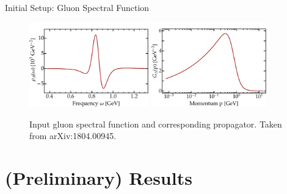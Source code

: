 \begin{frame}{Initial Setup: Gluon Spectral Function}
\begin{figure}[t]
\hfill
	\centering
	\includegraphics[width = 0.46\textwidth, trim= 4em 0 0 0]{figs/plots/GluonSpecFuncPlot}
\hfill
	\includegraphics[width = 0.445\textwidth, trim= 4em 0 0 0]{figs/plots/GluonPropPlot}
\hfill
	\caption[Input gluon spectral function and corresponding propagator.]{Input gluon spectral function and corresponding propagator. Taken from arXiv:\alert{1804.00945}.}
\label{fig:gluon_specfunc_and_prop}
\end{figure}\end{frame}

\section{(Preliminary) Results}

